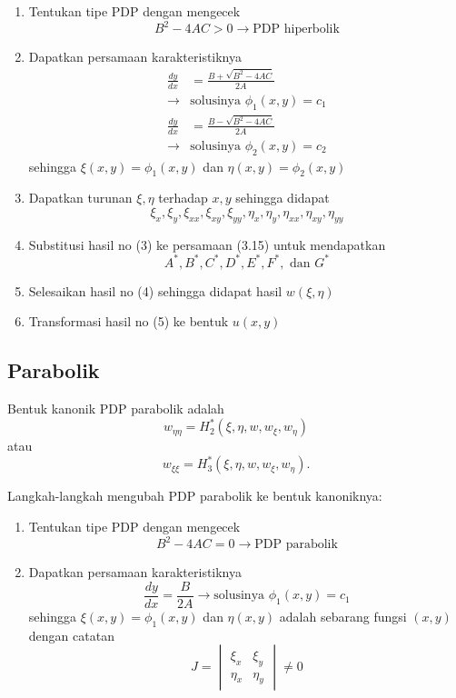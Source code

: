 \documentclass[a4paper,extrafontsizes, 9pt]{memoir}
\begin{document}
\begin{multicols}{3}
\begin{enumerate}
    \item Tentukan tipe PDP dengan mengecek
    \[
    B^2 - 4AC > 0 \rightarrow \text{PDP hiperbolik}
    \]

    \item Dapatkan persamaan karakteristiknya
    \begin{align*}
        \frac{dy}{dx} &= \frac{B + \sqrt{B^2 - 4AC}}{2A} \\\rightarrow& \text{solusinya } \phi_1(x,y) = c_1 \\
        \frac{dy}{dx} &= \frac{B - \sqrt{B^2 - 4AC}}{2A} \\\rightarrow& \text{solusinya } \phi_2(x,y) = c_2
    \end{align*}
    sehingga \( \xi(x,y) = \phi_1(x,y) \) dan \( \eta(x,y) = \phi_2(x,y) \)

    \item Dapatkan turunan \( \xi, \eta \) terhadap \( x, y \) sehingga didapat
    \[
    \xi_x, \xi_y, \xi_{xx}, \xi_{xy}, \xi_{yy}, \eta_x, \eta_y, \eta_{xx}, \eta_{xy}, \eta_{yy}
    \]

    \item Substitusi hasil no (3) ke persamaan (3.15) untuk mendapatkan
    \[
    A^*, B^*, C^*, D^*, E^*, F^*, \text{ dan } G^*
    \]

    \item Selesaikan hasil no (4) sehingga didapat hasil
    $
    w(\xi, \eta)
    $

    \item Transformasi hasil no (5) ke bentuk
    $
    u(x, y)
    $
\end{enumerate}
\subsection*{\small Parabolik}
    Bentuk kanonik PDP parabolik adalah
\[
w_{\eta\eta} = H_2^*(\xi, \eta, w, w_\xi, w_\eta)
\]
atau
\[
w_{\xi\xi} = H_3^*(\xi, \eta, w, w_\xi, w_\eta).
\]

Langkah-langkah mengubah PDP parabolik ke bentuk kanoniknya:

\begin{enumerate}
    \item Tentukan tipe PDP dengan mengecek
    \[
    B^2 - 4AC = 0 \rightarrow \text{PDP parabolik}
    \]

    \item Dapatkan persamaan karakteristiknya
    \[
    \frac{dy}{dx} = \frac{B}{2A} \rightarrow \text{solusinya } \phi_1(x,y) = c_1
    \]
    sehingga \( \xi(x,y) = \phi_1(x,y) \) dan \( \eta(x,y) \) adalah sebarang fungsi \( (x,y) \) dengan catatan
    \[
    J = 
    \begin{vmatrix}
        \xi_x & \xi_y \\
        \eta_x & \eta_y
    \end{vmatrix} \ne 0
    \]


\end{enumerate}
\end{multicols}
\end{document}
